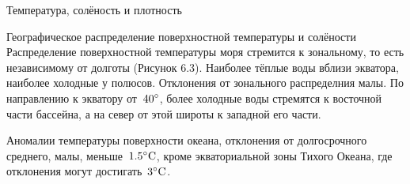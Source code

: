 \begin{chapter}{Температура, солёность и плотность}
\begin{section}{Географическое распределение поверхностной температуры и солёности}
Распределение поверхностной температуры моря стремится к зональному,
то есть независимому от долготы (Рисунок 6.3). Наиболее тёплые воды
вблизи экватора, наиболее холодные у полюсов. Отклонения от зонального
распределния малы. По направлению к экватору от~${40}^\circ$, более
холодные воды стремятся к восточной части бассейна, а на север от этой
широты к западной его части.
%


Аномалии температуры поверхности океана, отклонения от долгосрочного
среднего, малы, меньше~${1.5}^\circ\mbox{C}$, кроме экваториальной зоны Тихого
Океана, где отклонения могут достигать~${3}^\circ\mbox{C}$.
%
%


\end{section}
\end{chapter}
